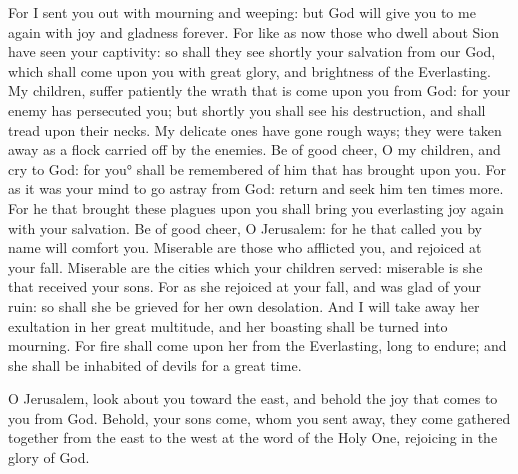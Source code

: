 {For I sent you out with mourning and weeping: but God will give you to me again with joy and gladness forever.
For like as now those who dwell about Sion have seen your captivity: so shall they see shortly your salvation from
 our God, which shall come upon you with great glory, and brightness of the Everlasting.
My children, suffer patiently the wrath that is come upon you from God: for your enemy has persecuted you; but shortly you shall see his destruction, and shall tread upon their necks.
My delicate ones have gone rough ways; they were taken away as a flock carried off by the enemies.
Be of good cheer, O my children, and cry to God: for you° shall be remembered of him that has brought
{} upon you.
For as it was your mind to go astray from God:
{} return and seek him ten times more.
For he that brought these plagues upon you shall bring you everlasting joy again with your salvation.
Be of good cheer, O Jerusalem: for he that called you by name will comfort you.
Miserable are those who afflicted you, and rejoiced at your fall.
Miserable are the cities which your children served: miserable is she that received your sons.
For as she rejoiced at your fall, and was glad of your ruin: so shall she be grieved for her own desolation.
And I will take away her exultation in her great multitude, and her boasting shall be turned into mourning.
For fire shall come upon her from the Everlasting, long to endure; and she shall be inhabited of
 devils for a great time.
\par }{\PP {}O Jerusalem, look about you toward the east, and behold the joy that comes to you from God.
Behold, your sons come, whom you sent away, they come gathered together from the east to the west at the word of the Holy One, rejoicing in the glory of God.

}
